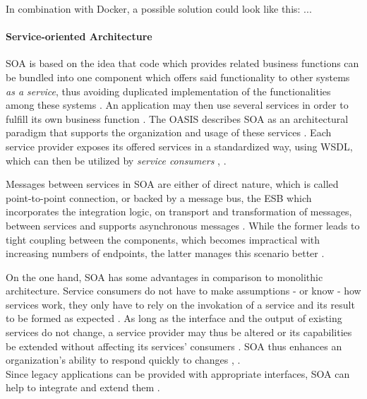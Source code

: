     In combination with Docker, a possible solution could look like this: ...

  \paragraph{Service-oriented Architecture} %
    \label{par:service_oriented_architecture}
    \ac{SOA} is based on the idea that code which provides related business functions can be bundled into one component which offers said functionality to other systems \emph{as a service}, thus avoiding duplicated implementation of the functionalities among these systems \cite[p.8]{Hohpe2004Enterprise}.
    An application may then use several services in order to fulfill its own business function \cite[p.~390]{Papazoglou2007Service}.
    The \ac{OASIS} describes \ac{SOA} as an architectural paradigm that supports the organization and usage of these services \cite{Standards2006Reference}. Each service provider exposes its offered services in a standardized way, \eg using \ac{WSDL}, which can then be utilized by \emph{service consumers} \cite[p.~390]{Papazoglou2007Service}, \cite[p.~17]{Strimbei2015Software}.

    Messages between services in \ac{SOA} are either of direct nature, which is called point-to-point connection, or backed by a message bus, the \ac{ESB} which incorporates the integration logic, \eg on transport and transformation of messages, between services and supports asynchronous messages \cite[p.~393]{Papazoglou2007Service}. While the former leads to tight coupling between the components, which becomes impractical with increasing numbers of endpoints, the latter manages this scenario better \cite[p.~393]{Papazoglou2007Service}.

    On the one hand, \ac{SOA} has some advantages in comparison to monolithic architecture.
    Service consumers do not have to make assumptions - or know - how services work, they only have to rely on the invokation of a service and its result to be formed as expected \cite[p.~390]{Papazoglou2007Service}. As long as the interface and the output of existing services do not change, a service provider may thus be altered or its capabilities be extended without affecting its services' consumers \cite[p.~390]{Papazoglou2007Service}. \ac{SOA} thus enhances an organization’s ability to respond quickly to changes \cite[p.~390]{Papazoglou2007Service}, \cite[p.~254]{Choi2010Implementing}. \\
    Since legacy applications can be provided with appropriate interfaces, SOA can help to integrate and extend them \cite[p.~390]{Papazoglou2007Service}.

